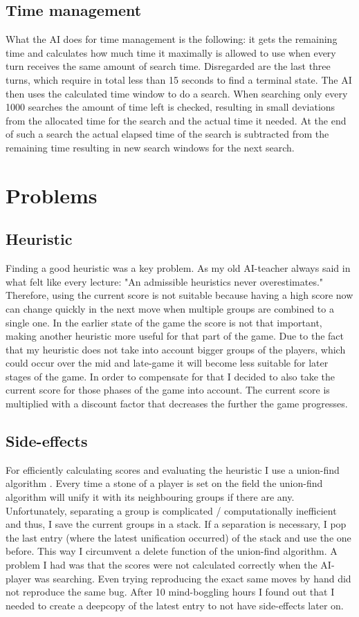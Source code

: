 \documentclass[a4paper]{article}
\begin{document}
\subsection{Time management}
What the AI does for time management is the following: it gets the remaining time and calculates how much time it maximally is allowed to use when every turn receives the same amount of search time. Disregarded are the last three turns, which require in total less than 15 seconds to find a terminal state. The AI then uses the calculated time window to do a search. When searching only every 1000 searches the amount of time left is checked, resulting in small deviations from the allocated time for the search and the actual time it needed. At the end of such a search the actual elapsed time of the search is subtracted from the remaining time resulting in new search windows for the next search.

\section{Problems}
\subsection{Heuristic}
Finding a good heuristic was a key problem. As my old AI-teacher always said in what felt like every lecture: "An admissible heuristics never overestimates." Therefore, using the current score is not suitable because having a high score now can change quickly in the next move when multiple groups are combined to a single one. In the earlier state of the game the score is not that important, making another heuristic more useful for that part of the game. Due to the fact that my heuristic does not take into account bigger groups of the players, which could occur over the mid and late-game it will become less suitable for later stages of the game. In order to compensate for that I decided to also take the current score for those phases of the game into account. The current score is multiplied with a discount factor that decreases the further the game progresses.

\subsection{Side-effects}
For efficiently calculating scores and evaluating the heuristic I use a union-find algorithm \cite{galler1964improved}. Every time a stone of a player is set on the field the union-find algorithm will unify it with its neighbouring groups if there are any. Unfortunately, separating a group is complicated / computationally inefficient and thus, I save the current groups in a stack. If a separation is necessary, I pop the last entry (where the latest unification occurred) of the stack and use the one before. This way I circumvent a delete function of the union-find algorithm.
A problem I had was that the scores were not calculated correctly when the AI-player was searching. Even trying reproducing the exact same moves by hand did not reproduce the same bug. After 10 mind-boggling hours I found out that I needed to create a deepcopy of the latest entry to not have side-effects later on.
\end{document}
